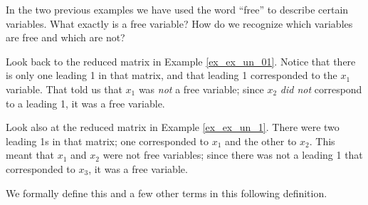 \medskip




In the two previous examples we have used the word ``free'' to describe certain variables. What exactly is a free variable? How do we recognize which variables are free and which are not? 

Look back to the reduced matrix in Example \ref{ex_ex_un_01}. Notice that there is only one leading 1 in that matrix, and that leading 1 corresponded to the $x_1$ variable. That told us that $x_1$ was \textit{not} a free variable; since $x_2$ \textit{did not} correspond to a leading 1, it was a free variable.

Look also at the reduced matrix in Example \ref{ex_ex_un_1}. There were two leading 1s in that matrix; one corresponded to $x_1$ and the other to $x_2$. This meant that $x_1$ and $x_2$ were not free variables; since there was not a leading 1 that corresponded to $x_3$, it was a free variable. 

We formally define this and a few other terms in this following definition.

\smallskip


\smallskip





